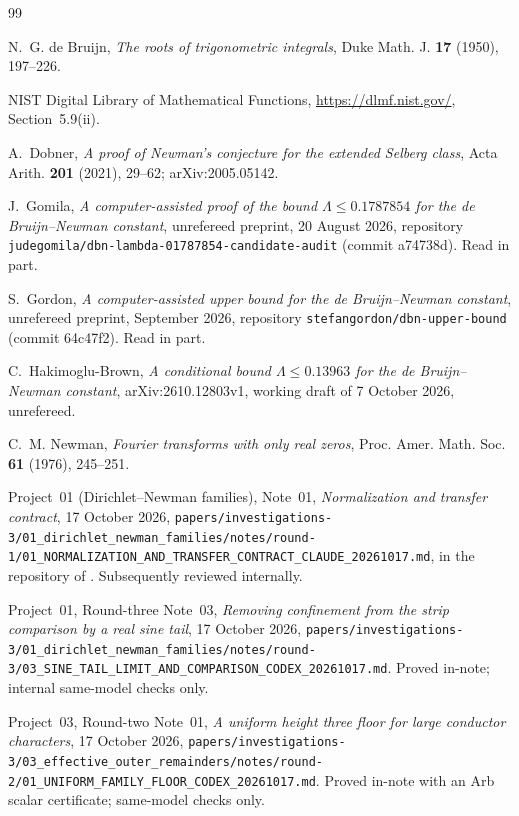\documentclass[11pt]{article}
\theoremstyle{definition}
\theoremstyle{remark}
\numberwithin{equation}{section}
\begin{document}
\begin{thebibliography}{99}

N.~G. de Bruijn,
\emph{The roots of trigonometric integrals},
Duke Math. J. \textbf{17} (1950), 197--226.

NIST Digital Library of Mathematical Functions, \url{https://dlmf.nist.gov/},
Section~5.9(ii).

A.~Dobner,
\emph{A proof of Newman's conjecture for the extended Selberg class},
Acta Arith. \textbf{201} (2021), 29--62; arXiv:2005.05142.

J.~Gomila,
\emph{A computer-assisted proof of the bound $\Lambda\le0.1787854$ for the
de Bruijn--Newman constant}, unrefereed preprint, 20 August 2026,
repository \nolinkurl{judegomila/dbn-lambda-01787854-candidate-audit}
(commit a74738d). Read in part.

S.~Gordon,
\emph{A computer-assisted upper bound for the de Bruijn--Newman constant},
unrefereed preprint, September 2026, repository
\nolinkurl{stefangordon/dbn-upper-bound} (commit 64c47f2). Read in part.

C.~Hakimoglu-Brown,
\emph{A conditional bound $\Lambda\le0.13963$ for the de Bruijn--Newman
constant}, arXiv:2610.12803v1, working draft of 7 October 2026,
unrefereed.

C.~M. Newman,
\emph{Fourier transforms with only real zeros},
Proc. Amer. Math. Soc. \textbf{61} (1976), 245--251.

Project~01 (Dirichlet--Newman families), Note~01,
\emph{Normalization and transfer contract}, 17 October 2026,
\nolinkurl{papers/investigations-3/01_dirichlet_newman_families/notes/round-1/01_NORMALIZATION_AND_TRANSFER_CONTRACT_CLAUDE_20261017.md},
in the repository of \cite{records}. Subsequently reviewed internally.

Project~01, Round-three Note~03,
\emph{Removing confinement from the strip comparison by a real sine tail},
17 October 2026,
\nolinkurl{papers/investigations-3/01_dirichlet_newman_families/notes/round-3/03_SINE_TAIL_LIMIT_AND_COMPARISON_CODEX_20261017.md}.
Proved in-note; internal same-model checks only.

Project~03, Round-two Note~01,
\emph{A uniform height three floor for large conductor characters},
17 October 2026,
\nolinkurl{papers/investigations-3/03_effective_outer_remainders/notes/round-2/01_UNIFORM_FAMILY_FLOOR_CODEX_20261017.md}.
Proved in-note with an Arb scalar certificate; same-model checks only.


\end{thebibliography}
\end{document}
